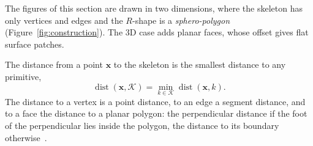 \documentclass[11pt,a4paper]{article}
\newcommand{\skel}{\mathcal{K}}        %
\newcommand{\vect}[1]{\mathbf{#1}}
\begin{document}
The figures of this section are drawn in two dimensions, where the skeleton has
only vertices and edges and the $R$-shape is a
\emph{sphero-polygon}~\cite{alonso2008} (Figure~\ref{fig:construction}). The 3D
case adds planar faces, whose offset gives flat surface patches.

The distance from a point $\vect{x}$ to the skeleton is the smallest distance to
any primitive,
%
\begin{equation}
  \operatorname{dist}(\vect{x},\skel) = \min_{k\in\skel}\operatorname{dist}(\vect{x},k).
  \label{eq:distmin}
\end{equation}
%
The distance to a vertex is a point distance, to an edge a segment distance, and
to a face the distance to a planar polygon: the perpendicular distance if the foot
of the perpendicular lies inside the polygon, the distance to its boundary
otherwise~\cite{ericson2005}.
\end{document}
